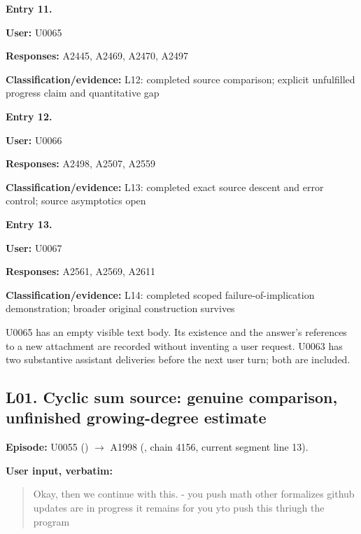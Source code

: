 
\textbf{Entry 11.}

\textbf{User:} U0065

\textbf{Responses:} A2445, A2469, A2470, A2497

\textbf{Classification/evidence:} L12: completed source comparison;
explicit unfulfilled progress claim and quantitative gap


\textbf{Entry 12.}

\textbf{User:} U0066

\textbf{Responses:} A2498, A2507, A2559

\textbf{Classification/evidence:} L13: completed exact source descent
and error control; source asymptotics open


\textbf{Entry 13.}

\textbf{User:} U0067

\textbf{Responses:} A2561, A2569, A2611

\textbf{Classification/evidence:} L14: completed scoped
failure-of-implication demonstration; broader original construction
survives

U0065 has an empty visible text body. Its existence and the answer's
references to a new attachment are recorded without inventing a user
request. U0063 has two substantive assistant deliveries before the next
user turn; both are included.

\subsection{L01. Cyclic sum source: genuine comparison, unfinished
growing-degree
estimate}\label{TranscriptLedgerStage:l01.-cyclic-sum-source-genuine-comparison-unfinished-growing-degree-estimate}

\textbf{Episode:} U0055
(\protect{})
\allowbreak{}\ensuremath{→}\allowbreak{} A1998
(\protect{}, chain 4156,
current segment line 13).

\textbf{User input, verbatim:}

\begin{quote}
Okay, then we continue with this. - you push math other formalizes
github updates are in progress it remains for you yto push this thriugh
the program
\end{quote}


